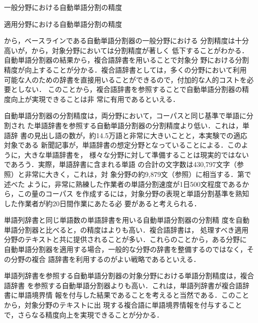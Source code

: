 \documentclass[japanese]{jnlp_JS2.0}
\def\tabref#1{}
\def\subref#1{}
\def\AWS#1{}
\begin{document}
\begin{table}[tb]
  \caption{一般分野における自動単語分割の精度}
  \label{table:result1}

\end{table}

\begin{table}[tb]
  \caption{適用分野における自動単語分割の精度}
  \label{table:result2}

\end{table}

\tabref{table:result1}から，ベースラインである自動単語分割器\AWS{B}の一般分野における
分割精度は十分高いが，\tabref{table:result2}から，対象分野においては分割精度が著しく
低下することがわかる．自動単語分割器\AWS{C}の結果から，複合語辞書を用いることで対象分
野における分割精度が向上することが分かる．複合語辞書としては，多くの分野において利用
可能な人のための辞書を直接用いることができるので，付加的な人的コストを必要としない．
このことから，複合語辞書を参照することで自動単語分割器の精度向上が実現できることは非
常に有用であるといえる．

自動単語分割器\AWS{C}の分割精度は，両分野において，コーパスと同じ基準で単語に分割され
た単語辞書\AWS{w1}を参照する自動単語分割器\AWS{W1}の分割精度より低い．これは，単語辞
書\AWS{w1}の見出し語の数が，約14.5万語と非常に大きいことと，本実験での適応対象である
新聞記事が，単語辞書の想定分野となっていることによる．このように，大きな単語辞書を，
様々な分野に対して準備することは現実的ではないであろう．実際，単語辞書に含まれる単語
の合計の文字数は430,797文字（\tabref{table:dictionary}参照）と非常に大きく，これは，対
象分野の約9,879文（\tabref{table:corpus}参照）に相当する．第\subref{section:WSC}で述べた
ように，非常に熟練した作業者の単語分割速度が1日500文程度であるから，この量のコーパス
を作成するには，対象分野の表現と単語分割基準を熟知した作業者が約20日間作業にあたる必
要があると考えられる．

単語列辞書\AWS{s}と同じ単語数の単語辞書\AWS{w2}を用いる自動単語分割器\AWS{W2}の分割精
度を自動単語分割器\AWS{C}と比べると，\AWS{C}の精度は\AWS{W2}よりも高い．複合語辞書は，
処理すべき適用分野のテキストと共に提供されることが多い．これらのことから，ある分野に
自動単語分割器を適用する場合，一般的な分野の辞書を整備するのではなく，その分野の複合
語辞書を利用するのがよい戦略であるといえる．

単語列辞書を参照する自動単語分割器\AWS{S}の対象分野における単語分割精度は，複合語辞書
を参照する自動単語分割器\AWS{C}よりも高い．これは，単語列辞書が複合語辞書に単語境界情
報を付与した結果であることを考えると当然である．このことから，対象分野のテキストに出
現する複合語に単語境界情報を付与することで，さらなる精度向上を実現できることが分かる．
\end{document}
